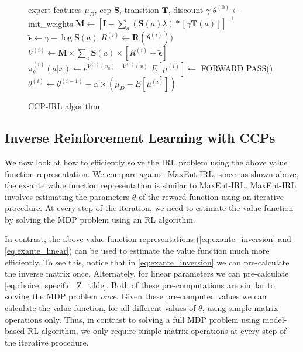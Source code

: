 \documentclass{article}
\begin{document}
\begin{figure}[ht]
  \begin{algorithm}[H]
    \caption{CCP-IRL algorithm} \label{algo:ccp_irl_algorithm}
    \begin{algorithmic}[1]
         expert features $\mu_D$, ccp $\mathbf{S}$, transition $\mathbf{T}$, discount $\gamma$
        \STATE $\theta^{(0)} \gets$ init\_weights
        \STATE $\mathbf{M} \gets \left[\mathbf{I}-\sum_{a}(\mathbf{S}(a) \lambda) *\left[ \gamma \mathbf{T}(a)  \right]\right]^{-1}$ 
        \STATE $\tilde{\bm{\epsilon}} \gets \gamma - \log \mathbf{S}(a)$
            \STATE $R^{(i)} \gets \mathbf{R}(\theta^{(i)}))$
            \STATE $V^{(i)} \gets \mathbf{M} \times \sum_{a}{\mathbf{S}(a) \times \left[ R^{(i)} +\tilde{\bm{\epsilon}}\right]}$
            \STATE $\pi_{\theta}^{(i)}(a|x) \gets e^{V^{(i)}(x_a) - V^{(i)}(x)}$
            \STATE $E[\mu^{(i)}] \gets $ FORWARD PASS()
            \STATE $\theta^{(i)} \gets \theta^{(i-1)} - \alpha \times (\mu_D - E[\mu^{(i)}])$
        \ENDFOR
    \end{algorithmic}
  \end{algorithm}
\end{figure}


\subsection{Inverse Reinforcement Learning with CCPs}
We now look at how to efficiently solve the IRL problem using the above value function representation. 
We compare against MaxEnt-IRL, since, as shown above, the ex-ante value function representation is similar to MaxEnt-IRL.
MaxEnt-IRL involves estimating the parameters $\theta$ of the reward function using an iterative procedure.
At every step of the iteration, we need to estimate the value function by solving the MDP problem using an RL algorithm.

In contrast, the above value function representations (\eqref{eq:exante_inversion} and \eqref{eq:exante_linear}) can be used to estimate the value function much more efficiently. To see this, notice that in \eqref{eq:exante_inversion} we can pre-calculate the inverse matrix once. Alternately, for linear parameters we can pre-calculate \eqref{eq:choice_specific_Z_tilde}. Both of these pre-computations are similar to solving the MDP problem \textit{once}. Given these pre-computed values we can calculate the value function, for all different values of $\theta$, using simple matrix operations only. Thus, in contrast to solving a full MDP problem using model-based RL algorithm, we only require simple matrix operations at every step of the iterative procedure.
\end{document}
